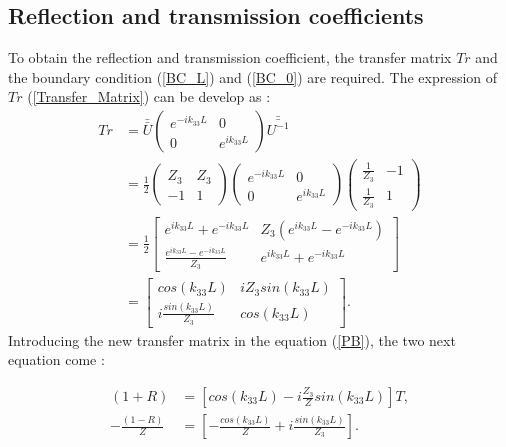 \documentclass{article}
\begin{document}
\subsection*{Reflection and transmission coefficients}
    To obtain the reflection and transmission coefficient, the transfer matrix $Tr$ and the boundary condition (\ref{BC_L}) and (\ref{BC_0}) are required.
    The expression of $Tr$ (\ref{Transfer_Matrix}) can be develop as :
     	\begin{align*}
 	Tr &=\bar{\bar{U}} \begin{pmatrix}
                         e^{-ik_{33}L} & 0 \\ 0 & e^{ik_{33}L}
                    \end{pmatrix} \bar{\bar{U^{-1}}}\\
     &= \frac{1}{2} \begin{pmatrix}
     					Z_3 & Z_3 \\ -1 & 1
      				\end{pmatrix} \begin{pmatrix}
                                   	e^{-ik_{33}L} & 0 \\ 0 & e^{ik_{33}L}
                                   \end{pmatrix} \begin{pmatrix}
     												\frac{1}{Z_3} & -1 \\ \frac{1}{Z_3} & 1
      											 \end{pmatrix}\\
    &=\frac{1}{2} \begin{bmatrix}
    				e^{ik_{33}L}+e^{-ik_{33}L} & Z_3(e^{ik_{33}L}-e^{-ik_{33}L}) \\ 
    				\frac{e^{ik_{33}L}-e^{-ik_{33}L}}{Z_3} & e^{ik_{33}L}+e^{-ik_{33}L}
    				\end{bmatrix}\\
 	&= \begin{bmatrix}
    				cos(k_{33}L) & i Z_3 sin(k_{33}L) \\ 
    				i\frac{sin(k_{33}L)}{Z_3} & cos(k_{33}L)
    	\end{bmatrix}.
    \end{align*}
    Introducing the new transfer matrix in the equation (\ref{PB}), the two next equation come :
    
    \begin{align}
    (1+R)&=[cos(k_{33}L)-i\frac{Z_3}{Z} sin(k_{33}L)]T,\label{T_cal1} \\ 
    -\frac{(1-R)}{Z}&=[-\frac{cos(k_{33}L)}{Z}+i\frac{sin(k_{33}L)}{Z_3}].\label{T_cal2}
    \end{align}
    
\end{document}
